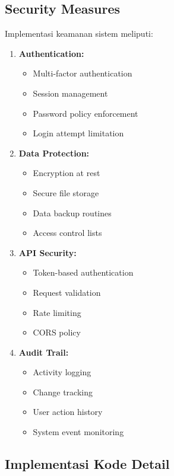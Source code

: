 \documentclass[a4paper]{report}
\begin{document}
\subsection{Security Measures}
Implementasi keamanan sistem meliputi:

\begin{enumerate}
\item \textbf{Authentication:}
    \begin{itemize}
    \item Multi-factor authentication
    \item Session management
    \item Password policy enforcement
    \item Login attempt limitation
    \end{itemize}

\item \textbf{Data Protection:}
    \begin{itemize}
    \item Encryption at rest
    \item Secure file storage
    \item Data backup routines
    \item Access control lists
    \end{itemize}

\item \textbf{API Security:}
    \begin{itemize}
    \item Token-based authentication
    \item Request validation
    \item Rate limiting
    \item CORS policy
    \end{itemize}

\item \textbf{Audit Trail:}
    \begin{itemize}
    \item Activity logging
    \item Change tracking
    \item User action history
    \item System event monitoring
    \end{itemize}
\end{enumerate}

\subsection{Implementasi Kode Detail}
\end{document}
